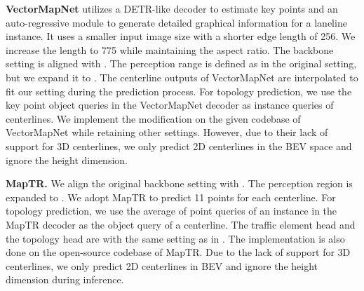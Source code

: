 \smallskip
\noindent
\textbf{VectorMapNet} utilizes a DETR-like decoder to estimate key points and an auto-regressive module to generate detailed graphical information for a laneline instance.
It uses a smaller input image size with a shorter edge length of 256.
We increase the length to 775 while maintaining the aspect ratio.
The backbone setting is aligned with \algname.
The perception range is defined as  in the original setting, but we expand it to
.
The centerline outputs of VectorMapNet are interpolated to fit our setting during the prediction process.
For topology prediction, we use the key point object queries in the VectorMapNet decoder as instance queries of centerlines. 
We implement the modification on the given codebase of VectorMapNet while retaining other settings.
However, due to their lack of support for 3D centerlines, we only predict 2D centerlines in the BEV space and ignore the height dimension.


\smallskip
\noindent
\textbf{MapTR.}
We align the original backbone setting with \algname. 
The perception region is expanded to .
We adopt MapTR to predict 11 points for each centerline. 
For topology prediction, we use the average of point queries of an instance in the MapTR decoder as the object query of a centerline. The traffic element head and the topology head are with the same setting as in \algname. 
The implementation is also done on the open-source codebase of MapTR.
Due to the lack of support for 3D centerlines, we only predict 2D centerlines in BEV and ignore the height dimension during inference.



\begin{table}[t!]
    \centering
    \caption{
        \textbf{Comparison on centerline perception with a ResNet-50 backbone.}
        ``Topology'' denotes that the network is trained with topology supervision.
    }
    \label{tab:ex:unifiedbackbone}
\end{table}

